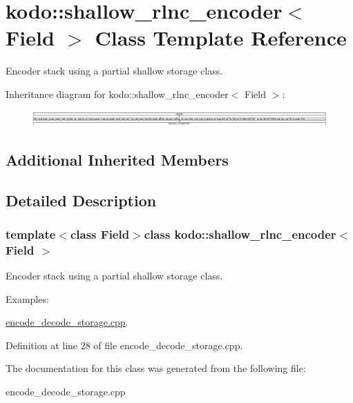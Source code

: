 \hypertarget{classkodo_1_1shallow__rlnc__encoder}{\section{kodo\-:\-:shallow\-\_\-rlnc\-\_\-encoder$<$ Field $>$ Class Template Reference}
\label{classkodo_1_1shallow__rlnc__encoder}
}


Encoder stack using a partial shallow storage class.  


Inheritance diagram for kodo\-:\-:shallow\-\_\-rlnc\-\_\-encoder$<$ Field $>$\-:\begin{figure}[H]
\begin{center}
\leavevmode
\includegraphics[height=0.589681cm]{classkodo_1_1shallow__rlnc__encoder}
\end{center}
\end{figure}
\subsection*{Additional Inherited Members}


\subsection{Detailed Description}
\subsubsection*{template$<$class Field$>$class kodo\-::shallow\-\_\-rlnc\-\_\-encoder$<$ Field $>$}

Encoder stack using a partial shallow storage class. \begin{Desc}
\item[Examples\-: ]\par
\hyperlink{encode_decode_storage_8cpp-example}{encode\-\_\-decode\-\_\-storage.\-cpp}.\end{Desc}


Definition at line 28 of file encode\-\_\-decode\-\_\-storage.\-cpp.



The documentation for this class was generated from the following file\-:\begin{DoxyCompactItemize}
\item 
encode\-\_\-decode\-\_\-storage.\-cpp\end{DoxyCompactItemize}
